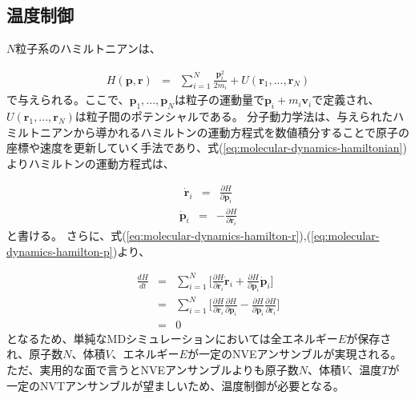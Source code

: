 \documentclass[titlepage]{jsreport}
\begin{document}
\subsection{温度制御}\label{principle-subsec:temperature-control}
$N$粒子系のハミルトニアンは、

\large
\begin{eqnarray}
H(\mathbf{p},\mathbf{r}) &=& \sum_{i=1}^N\frac{\mathbf{p}_i^2}{2m_i}+U(\mathbf{r}_1,...,\mathbf{r}_N) \label{eq:molecular-dynamics-hamiltonian}
\end{eqnarray}
\normalsize
で与えられる\cite{molecular-dynamics-hamiltonian}。ここで、$\mathbf{p}_1,...,\mathbf{p}_N$は粒子の運動量で$\mathbf{p}_i+m_i\mathbf{v}_i$で定義され、$U(\mathbf{r}_1,...,\mathbf{r}_N)$は粒子間のポテンシャルである。
分子動力学法は、与えられたハミルトニアンから導かれるハミルトンの運動方程式を数値積分することで原子の座標や速度を更新していく手法であり、式(\ref{eq:molecular-dynamics-hamiltonian})よりハミルトンの運動方程式は、

\large
\begin{eqnarray}
\dot{\mathbf{r}}_i &=& \frac{\partial H}{\partial \mathbf{p}_i} \label{eq:molecular-dynamics-hamilton-r}
\end{eqnarray}
\normalsize
\large
\begin{eqnarray}
\dot{\mathbf{p}}_i &=& -\frac{\partial H}{\partial \mathbf{r}_i} \label{eq:molecular-dynamics-hamilton-p}
\end{eqnarray}
\normalsize
と書ける。
さらに、式(\ref{eq:molecular-dynamics-hamilton-r}),(\ref{eq:molecular-dynamics-hamilton-p})より、

\large
\begin{eqnarray}
\frac{dH}{dt} &=& \sum_{i=1}^N\Bigg[\frac{\partial H}{\partial \mathbf{r}_i}\dot{\mathbf{r}}_i+\frac{\partial H}{\partial \mathbf{p}_i}\dot{\mathbf{p}}_i\Bigg] \nonumber \\
              &=&  \sum_{i=1}^N\Bigg[\frac{\partial H}{\partial \mathbf{r}_i}\frac{\partial H}{\partial \mathbf{p}_i}-\frac{\partial H}{\partial \mathbf{p}_i}\frac{\partial H}{\partial \mathbf{r}_i}\Bigg] \nonumber \\
              &=& 0 \label{eq:molecular-dynamics-hamilton-H}
\end{eqnarray}
\normalsize
となるため、単純なMDシミュレーションにおいては全エネルギー$E$が保存され、原子数$N$、体積$V$、エネルギー$E$が一定のNVEアンサンブル\cite{nve-ensemble}が実現される。
ただ、実用的な面で言うとNVEアンサンブルよりも原子数$N$、体積$V$、温度$T$が一定のNVTアンサンブル\cite{nvt-ensemble}が望ましいため、温度制御が必要となる。
\end{document}
